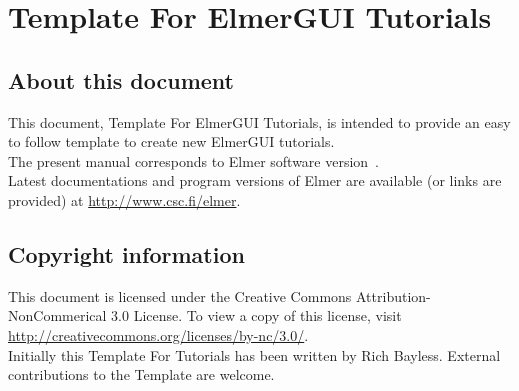 \chapter*{Template For ElmerGUI Tutorials}

\section*{About this document}

This document, Template For ElmerGUI Tutorials, is intended to provide an easy to follow template to create new ElmerGUI tutorials.\\

The present manual corresponds to Elmer software version~\elmerversion{}.\\

Latest documentations and program versions of Elmer are available (or links are provided) at \url{http://www.csc.fi/elmer}. 

\section*{Copyright information}

This document is licensed under the Creative Commons Attribution-NonCommerical 3.0 License.  To view a copy of this license, visit \url{http://creativecommons.org/licenses/by-nc/3.0/}.\\

Initially this Template For Tutorials has been written by Rich Bayless.  External contributions to the Template are welcome.



